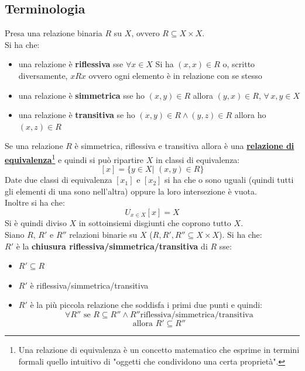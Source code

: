\subsection{Terminologia}
\begin{shaded}
  Presa una relazione binaria $R$ su $X$, ovvero $R\subseteq X\times X$.\\
  Si ha che:
  \begin{itemize}
    \item una relazione è \textbf{riflessiva} sse $\forall x\in X$ Si ha
    $(x, x)\in R$ o, scritto diversamente, $xRx$ ovvero ogni elemento è in
    relazione con se stesso 
    \item una relazione è \textbf{simmetrica} sse ho $(x, y)\in R$ allora
    $(y, x)\in R$, $\forall\, x, y\in X$
    \item una relazione è \textbf{transitiva} se ho $(x, y)\in R\land (y, z)\in R$
    allora ho $(x, z)\in R$
  \end{itemize}
  Se una relazione $R$ è simmetrica, riflessiva e transitiva allora è una
   \href{https://it.wikipedia.org/wiki/Relazione_di_equivalenza}{\textbf{relazione di equivalenza}}\footnote{Una relazione di equivalenza è un concetto matematico che esprime in termini formali quello intuitivo di "oggetti che condividono una certa proprietà".} e quindi si può ripartire $X$ in classi di
  equivalenza:
  \[[x]=\{y\in X|\,\,(x, y)\in R\}\]
  Date due classi di equivalenza $[x_1]$ e $[x_2]$ si ha che o sono uguali
  (quindi tutti gli elementi di una sono nell'altra) oppure la loro intersezione
  è vuota.\\
  Inoltre si ha che:
  \[U_{x\in X}[x]=X\]
  Si è quindi diviso $X$ in sottoinsiemi disgiunti che coprono tutto $X$.\\
  Siano $R$, $R'$ e $R''$ relazioni binarie su $X$ ($R, R', R'' \subseteq X \times X$). Si ha che:\\
  $R'$ è la \textbf{chiusura riflessiva/simmetrica/transitiva} di
  $R$ sse: 
  \begin{itemize}
    \item $R'\subseteq R$
    \item $R'$ è riflessiva/simmetrica/transitiva
    \item $R'$ è la più piccola relazione che soddisfa i primi due punti e
    quindi:
    \[\forall R''\mbox{ se }R\subseteq R''\land
      R''\mbox{riflessiva/simmetrica/transitiva}\]
    \[\mbox{allora } R'\subseteq R''\]
  \end{itemize}
\end{shaded}
